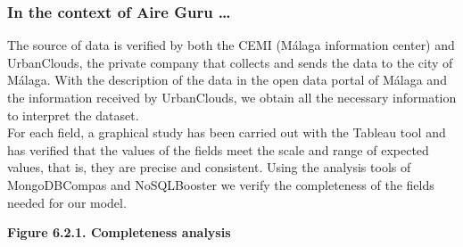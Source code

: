 \subsubsection*{In the context of Aire Guru \ldots} 

The source of data is verified by both the CEMI (Málaga information center) and UrbanClouds, the private company
that collects and sends the data to the city of Málaga. With the description of the data in the open data portal of Málaga and the information received by UrbanClouds,
we obtain all the necessary information to interpret the dataset. \\

For each field, a graphical study has been carried out with the Tableau tool and has verified that the values of the
fields meet the scale and range of expected values, that is, they are precise and consistent.
Using the analysis tools of MongoDBCompas and NoSQLBooster we verify the completeness of the fields needed for our model.

\begin{center}
    \bf{ 
    Figure 6.2.1. Completeness analysis}
\end{center} 